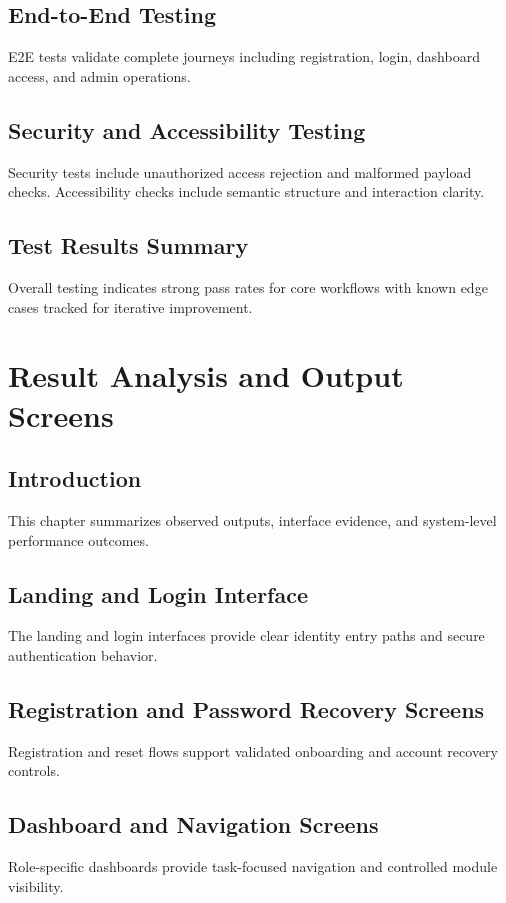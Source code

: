 \documentclass[12pt,a4paper]{article}
\begin{document}
\subsection{End-to-End Testing}
E2E tests validate complete journeys including registration, login, dashboard access, and admin operations.

\subsection{Security and Accessibility Testing}
Security tests include unauthorized access rejection and malformed payload checks. Accessibility checks include semantic structure and interaction clarity.

\subsection{Test Results Summary}
Overall testing indicates strong pass rates for core workflows with known edge cases tracked for iterative improvement.

\section{Result Analysis and Output Screens}

\subsection{Introduction}
This chapter summarizes observed outputs, interface evidence, and system-level performance outcomes.

\subsection{Landing and Login Interface}
The landing and login interfaces provide clear identity entry paths and secure authentication behavior.

\subsection{Registration and Password Recovery Screens}
Registration and reset flows support validated onboarding and account recovery controls.

\subsection{Dashboard and Navigation Screens}
Role-specific dashboards provide task-focused navigation and controlled module visibility.
\end{document}
